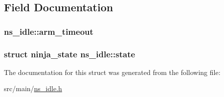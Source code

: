 \subsection{Field Documentation}
\hypertarget{structns__idle_a3845755649e487478f2f74be5f5ed449}{
\subsubsection[{arm\+\_\+timeout}]{ ns\+\_\+idle\+::arm\+\_\+timeout}}\label{structns__idle_a3845755649e487478f2f74be5f5ed449}
\hypertarget{structns__idle_a41f1bb6c506d7c69175a14667af80d78}{
\subsubsection[{state}]{\setlength{\rightskip}{0pt plus 5cm}struct {\bf ninja\+\_\+state} ns\+\_\+idle\+::state}}\label{structns__idle_a41f1bb6c506d7c69175a14667af80d78}


The documentation for this struct was generated from the following file\+:\begin{DoxyCompactItemize}
\item 
src/main/\hyperlink{ns__idle_8h}{ns\+\_\+idle.\+h}\end{DoxyCompactItemize}
